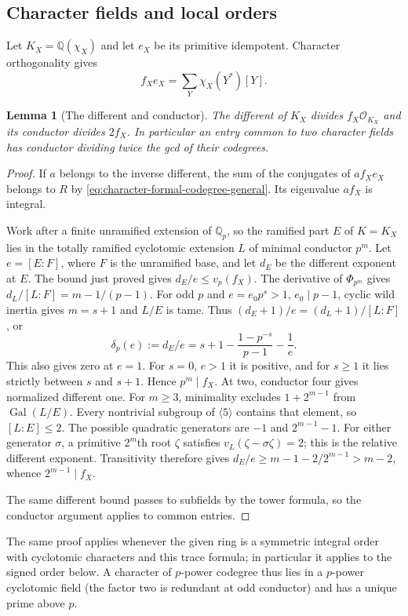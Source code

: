 \documentclass[11pt,a4paper]{article}
\numberwithin{equation}{section}
\newtheorem{lemma}[theorem]{Lemma}
\theoremstyle{remark}
\newcommand{\Gal}{\operatorname{Gal}}
\newcommand{\QQ}{\mathbb Q}
\begin{document}
\subsection{Character fields and local orders}
Let $K_X=\QQ(\chi_X)$ and let $e_X$ be its primitive idempotent.
Character orthogonality gives
\begin{equation}\label{eq:character-formal-codegree-general}
 f_Xe_X=\sum_Y\chi_X(Y^*)[Y].
\end{equation}
\begin{lemma}[The different and conductor]\label{cor:field-conductor}
The different of $K_X$ divides $f_X\mathcal O_{K_X}$ and its conductor divides $2f_X$.
In particular an entry common to two character fields has conductor dividing twice the gcd of their codegrees.
\end{lemma}
\begin{proof}
If $a$ belongs to the inverse different, the sum of the conjugates of $af_Xe_X$ belongs to $R$ by \eqref{eq:character-formal-codegree-general}. Its eigenvalue $af_X$ is integral.

Work after a finite unramified extension of $\QQ_p$, so the ramified
part $E$ of $K=K_X$ lies in the totally ramified cyclotomic extension
$L$ of minimal conductor $p^m$. Let $e=[E:F]$, where $F$ is the
unramified base, and let $d_E$ be the different exponent at $E$.
The bound just proved gives $d_E/e\le v_p(f_X)$.
The derivative of $\Phi_{p^m}$ gives
$d_L/[L:F]=m-1/(p-1)$.
For odd $p$ and $e=e_0p^s>1$, $e_0\mid p-1$, cyclic wild inertia
gives $m=s+1$ and $L/E$ is tame. Thus
$(d_E+1)/e=(d_L+1)/[L:F]$, or
\begin{equation}\label{eq:odd-normalized-different}
 \delta_p(e):=d_E/e=s+1-\frac{1-p^{-s}}{p-1}-\frac1e .
\end{equation}
This also gives zero at $e=1$. For $s=0$, $e>1$ it is positive,
and for $s\ge1$ it lies strictly between $s$ and $s+1$.
Hence $p^m\mid f_X$.
At two, conductor four gives normalized different one.
For $m\ge3$, minimality excludes $1+2^{m-1}$ from
$\Gal(L/E)$. Every nontrivial subgroup of $\langle5\rangle$
contains that element, so $[L:E]\le2$. The possible quadratic
generators are $-1$ and $2^{m-1}-1$. For either generator $\sigma$,
a primitive $2^m$th root $\zeta$ satisfies
$v_L(\zeta-\sigma\zeta)=2$; this is the relative different exponent.
Transitivity therefore gives
$d_E/e\ge m-1-2/2^{m-1}>m-2$, whence $2^{m-1}\mid f_X$.

The same different bound passes to subfields by the tower formula, so the conductor argument applies to common entries.
\end{proof}
The same proof applies whenever the given ring is a symmetric integral order with cyclotomic characters and this trace formula; in particular it applies to the signed order below. A character of $p$-power codegree thus lies in a $p$-power cyclotomic field
(the factor two is redundant at odd conductor) and has a unique prime above $p$.
\end{document}
